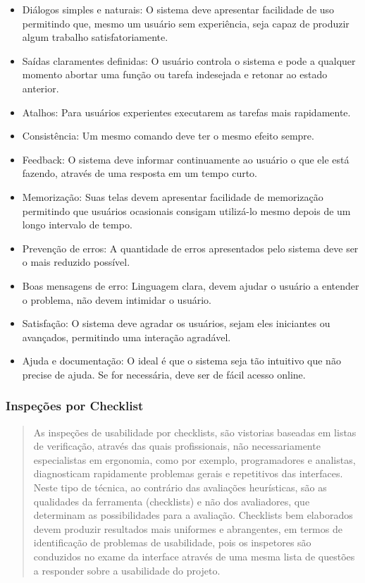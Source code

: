 \begin{itemize}
  \item Diálogos simples e naturais: O sistema deve apresentar facilidade de uso permitindo que, mesmo um usuário sem experiência, seja capaz de produzir algum trabalho satisfatoriamente.
  \item Saídas claramentes definidas: O usuário controla o sistema e pode a qualquer momento abortar uma função ou tarefa indesejada e retonar ao estado anterior.
  \item Atalhos: Para usuários experientes executarem as tarefas mais rapidamente.
  \item Consistência: Um mesmo comando deve ter o mesmo efeito sempre. 
  \item Feedback: O sistema deve informar continuamente ao usuário o que ele está fazendo, através de uma resposta em um tempo curto.
  \item Memorização: Suas telas devem apresentar facilidade de memorização permitindo que usuários ocasionais consigam utilizá-lo mesmo depois de um longo intervalo de tempo.
  \item Prevenção de erros: A quantidade de erros apresentados pelo sistema deve ser o mais reduzido possível.
  \item Boas mensagens de erro: Linguagem clara, devem ajudar o usuário a entender o problema, não devem intimidar o usuário.
  \item Satisfação: O sistema deve agradar os usuários, sejam eles iniciantes ou avançados, permitindo uma interação agradável.
  \item Ajuda e documentação: O ideal é que o sistema seja tão intuitivo que não precise de ajuda. Se for necessária, deve ser de fácil acesso online.
\end{itemize}


\subsubsection{Inspeções por Checklist}

\begin{quote}
As inspeções de usabilidade por checklists, são vistorias baseadas em listas de verificação, através das quais profissionais, não necessariamente especialistas em ergonomia, como por exemplo, programadores e analistas, diagnosticam rapidamente problemas gerais e repetitivos das interfaces. Neste tipo de técnica, ao contrário das avaliações heurísticas, são as qualidades da ferramenta (checklists) e não dos avaliadores, que determinam as possibilidades para a avaliação. Checklists bem elaborados devem produzir resultados mais uniformes e abrangentes, em termos de identificação de problemas de usabilidade, pois os inspetores são conduzidos no exame da interface através de uma mesma lista de questões a responder sobre a usabilidade do projeto.
\cite{cybil_apostila}
\end{quote} 


